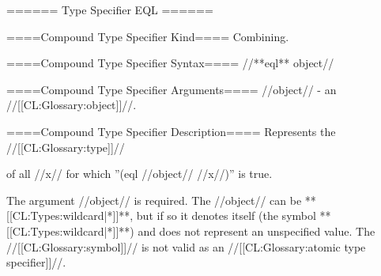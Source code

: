 ====== Type Specifier EQL ======

====Compound Type Specifier Kind====
Combining.

====Compound Type Specifier Syntax====
//**eql** object//

====Compound Type Specifier Arguments====
//object// - an //[[CL:Glossary:object]]//.

====Compound Type Specifier Description====
Represents the //[[CL:Glossary:type]]//

of all //x// for which ''(eql //object// //x//)'' is true.

The argument //object// is required. The //object// can be **[[CL:Types:wildcard|*]]**, but if so it denotes itself (the symbol **[[CL:Types:wildcard|*]]**) and does not represent an unspecified value. The //[[CL:Glossary:symbol]]//  is not valid as an //[[CL:Glossary:atomic type specifier]]//.

